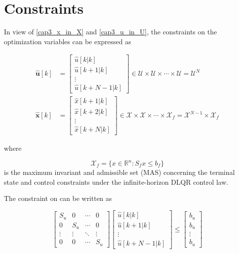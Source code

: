 
\section{Constraints}

In view of \eqref{cap3_x_in_X} and \eqref{cap3_u_in_U}, the constraints on the optimization 
variables can be expressed as

\noindent
\begin{align}
	\mathbf{\hat{u}}[k]&= \left[
		\begin{matrix}
			\hat{u}[k | k] \\
			\hat{u}[k + 1 | k] \\
			\vdots \\
			\hat{u}[k + N-1 | k]
		\end{matrix}
	\right]
	\in \mathcal{U} \times  \mathcal{U} \times \cdots \times \mathcal{U} = \mathcal{U}^N \\
		\mathbf{\hat{x}}[k] &= \left[
		\begin{matrix}
			\hat{x}[k + 1 | k] \\
			\hat{x}[k + 2 | k] \\
			\vdots \\
			\hat{x}[k + N | k]
		\end{matrix}
	\right]
	\in \mathcal{X} \times  \mathcal{X} \times \cdots \times \mathcal{X}_f = \mathcal{X}^{N-1} \times \mathcal{X}_f
\end{align}

\noindent
where

\noindent
\begin{equation}
	\mathcal{X}_f = \big\{x \in \mathbb{R}^n : S_f x \le b_f \big\}
\end{equation}
is the maximum invariant and admissible set (MAS) concerning the terminal state and control
constraints under the infinite-horizon DLQR control law.

The constraint on  can be  written as

\noindent
\begin{equation}
	\left[
		\begin{matrix}
			S_u & 0 & \cdots & 0 \\
			0 & S_u & \cdots & 0 \\
			\vdots & \vdots & \ddots & \vdots \\
			0 & 0 & \cdots & S_u
		\end{matrix}
	\right]
	\left[
		\begin{matrix}
			\hat{u}[k | k] \\
			\hat{u}[k + 1 | k] \\
			\vdots \\
			\hat{u}[k + N-1 | k]
		\end{matrix}
	\right]
	\leq
	\left[
		\begin{matrix}
			b_u \\
			b_u \\
			\vdots \\
			b_u
		\end{matrix}
	\right]
\end{equation}

